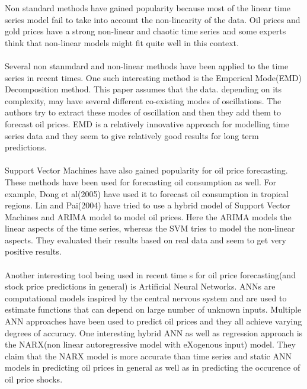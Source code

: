 \documentclass[runningheads]{llncs}
\begin{document}
\noindent Non standard methods have gained popularity because most of the linear time series model fail to take into account the non-linearity of the data. Oil prices and gold prices have a strong non-linear and chaotic time series and some experts think that non-linear models might fit quite well in this context.\\\\
\noindent Several non stanmdard and non-linear methods have been applied to the time series in recent times. One such interesting method is the Emperical Mode(EMD) Decomposition method\cite{oil-zhang}. This paper assumes that the data. depending on its complexity, may have several different co-existing modes of oscillations. The authors try to extract these modes of oscillation and then they add them to forecast oil prices. EMD is a relatively innovative approach for modelling time series data and they seem to give relatively good results for long term predictions.\\\\
\noindent Support Vector Machines have also gained popularity for oil price forecasting. These methods have been used for forecasting oil consumption as well. For example, Dong et al(2005)\cite{dongbing} have used it to forecast oil consumption in tropical regions. Lin and Pai(2004) have tried to use a hybrid model of Support Vector Machines and ARIMA model to model oil prices. Here the ARIMA models the linear aspects of the time series, whereas the SVM tries to model the non-linear aspects. They evaluated their results based on real data and seem to get very positive results.\\\\
\noindent Another interesting tool being used in recent time s for oil price forecasting(and stock price predictions in general) is Artificial Neural Networks. ANNs are computational models inspired by the central nervous system and are used to estimate functions that can depend on large number of unknown inputs. Multiple ANN approaches have been used to predict oil prices and they all achieve varying degrees of accuracy. One interesting hybrid ANN as well as regression approach is the NARX(non linear autoregressive model with eXogenous input) model. They claim that the NARX model is more accurate than time series and static ANN models in predicting oil prices in general as well as in predicting the occurence of oil price shocks.\\\\
   

\newpage
\end{document}
